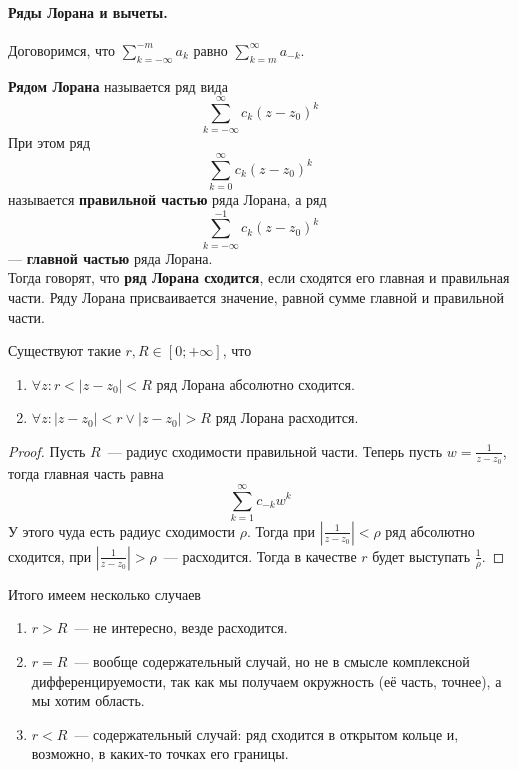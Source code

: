 \documentclass{article}
\begin{document}
    \paragraph{Ряды Лорана и вычеты.}
    \begin{remark}
        Договоримся, что $\sum\limits_{k=-\infty}^{-m}a_k$ равно $\sum\limits_{k=m}^\infty a_{-k}$.
    \end{remark}
    \begin{definition}
        \textbf{Рядом Лорана} называется ряд вида
        $$
        \sum\limits_{k=-\infty}^\infty c_k(z-z_0)^k
        $$
        При этом ряд
        $$
        \sum\limits_{k=0}^\infty c_k(z-z_0)^k
        $$
        называется \textbf{правильной частью} ряда Лорана, а ряд
        $$
        \sum\limits_{k=-\infty}^{-1}c_k(z-z_0)^k
        $$
        --- \textbf{главной частью} ряда Лорана.\\
        Тогда говорят, что \textbf{ряд Лорана сходится}, если сходятся его главная и правильная части. Ряду Лорана присваивается значение, равной сумме главной и правильной части.
    \end{definition}
    \begin{property}
        Существуют такие $r,R\in[0;+\infty]$, что
        \begin{enumerate}
            \item $\forall z:r<|z-z_0|<R$ ряд Лорана абсолютно сходится.
            \item $\forall z:|z-z_0|<r\lor|z-z_0|>R$ ряд Лорана расходится.
        \end{enumerate}
    \end{property}
    \begin{proof}
        Пусть $R$~--- радиус сходимости правильной части. Теперь пусть $w=\frac1{z-z_0}$, тогда главная часть равна
        $$
        \sum\limits_{k=1}^\infty c_{-k}w^k
        $$
        У этого чуда есть радиус сходимости $\rho$. Тогда при $\left|\frac1{z-z_0}\right|<\rho$ ряд абсолютно сходится, при $\left|\frac1{z-z_0}\right|>\rho$~--- расходится. Тогда в качестве $r$ будет выступать $\frac1\rho$.
    \end{proof}
    \begin{remark}
        Итого имеем несколько случаев
        \begin{enumerate}
            \item $r>R$~--- не интересно, везде расходится.
            \item $r=R$~--- вообще содержательный случай, но не в смысле комплексной дифференцируемости, так как мы получаем окружность (её часть, точнее), а мы хотим область.
            \item $r<R$~--- содержательный случай: ряд сходится в открытом кольце и, возможно, в каких-то точках его границы.
        \end{enumerate}
    \end{remark}
\end{document}
